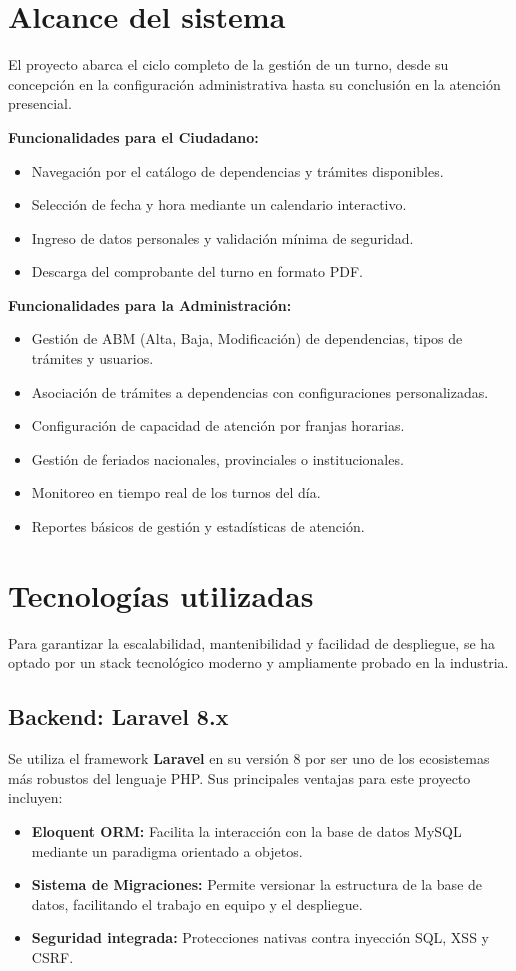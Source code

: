 \section{Alcance del sistema}
El proyecto abarca el ciclo completo de la gestión de un turno, desde su concepción en la configuración administrativa hasta su conclusión en la atención presencial.

\textbf{Funcionalidades para el Ciudadano:}
\begin{itemize}
    \item Navegación por el catálogo de dependencias y trámites disponibles.
    \item Selección de fecha y hora mediante un calendario interactivo.
    \item Ingreso de datos personales y validación mínima de seguridad.
    \item Descarga del comprobante del turno en formato PDF.
\end{itemize}

\textbf{Funcionalidades para la Administración:}
\begin{itemize}
    \item Gestión de ABM (Alta, Baja, Modificación) de dependencias, tipos de trámites y usuarios.
    \item Asociación de trámites a dependencias con configuraciones personalizadas.
    \item Configuración de capacidad de atención por franjas horarias.
    \item Gestión de feriados nacionales, provinciales o institucionales.
    \item Monitoreo en tiempo real de los turnos del día.
    \item Reportes básicos de gestión y estadísticas de atención.
\end{itemize}

\section{Tecnologías utilizadas}
Para garantizar la escalabilidad, mantenibilidad y facilidad de despliegue, se ha optado por un stack tecnológico moderno y ampliamente probado en la industria.

\subsection{Backend: Laravel 8.x}
Se utiliza el framework \textbf{Laravel} en su versión 8 por ser uno de los ecosistemas más robustos del lenguaje PHP. Sus principales ventajas para este proyecto incluyen:
\begin{itemize}
    \item \textbf{Eloquent ORM:} Facilita la interacción con la base de datos MySQL mediante un paradigma orientado a objetos.
    \item \textbf{Sistema de Migraciones:} Permite versionar la estructura de la base de datos, facilitando el trabajo en equipo y el despliegue.
    \item \textbf{Seguridad integrada:} Protecciones nativas contra inyección SQL, XSS y CSRF.
\end{itemize}

